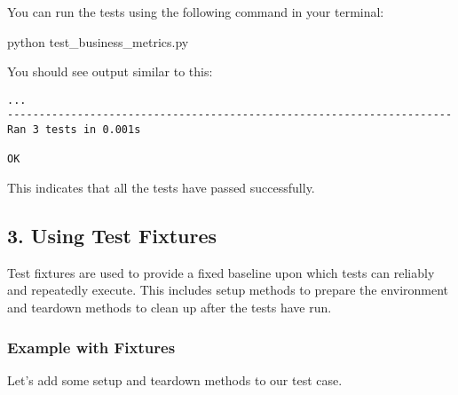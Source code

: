 \documentclass[
  letterpaper,
  DIV=11,
  numbers=noendperiod]{scrreprt}
\newenvironment{Shaded}{\begin{snugshade}}{\end{snugshade}}
\newcommand{\ExtensionTok}[1]{\textcolor[rgb]{0.00,0.23,0.31}{#1}}
\newcommand{\NormalTok}[1]{\textcolor[rgb]{0.00,0.23,0.31}{#1}}
\begin{document}
You can run the tests using the following command in your terminal:

\begin{Shaded}
\begin{Highlighting}[]
\ExtensionTok{python}\NormalTok{ test\_business\_metrics.py}
\end{Highlighting}
\end{Shaded}

You should see output similar to this:

\begin{verbatim}
...
----------------------------------------------------------------------
Ran 3 tests in 0.001s

OK
\end{verbatim}

This indicates that all the tests have passed successfully.

\subsection{3. Using Test Fixtures}\label{using-test-fixtures}

Test fixtures are used to provide a fixed baseline upon which tests can
reliably and repeatedly execute. This includes setup methods to prepare
the environment and teardown methods to clean up after the tests have
run.

\subsubsection{Example with Fixtures}\label{example-with-fixtures}

Let's add some setup and teardown methods to our test case.
\end{document}
